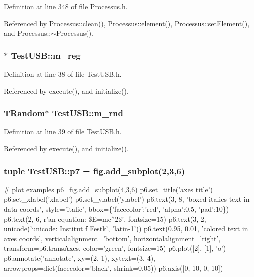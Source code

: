 Definition at line 348 of file Processus.h.

Referenced by Processus::clean(), Processus::element(), Processus::setElement(), and Processus::$\sim$Processus().\hypertarget{classTestUSB_a5f2bd3ef5db056bcfd803cb94d3a6587}{
\subsubsection[{m\_\-reg}]{$\ast$ {\bf TestUSB::m\_\-reg}}}
\label{classTestUSB_a5f2bd3ef5db056bcfd803cb94d3a6587}


Definition at line 38 of file TestUSB.h.

Referenced by execute(), and initialize().\hypertarget{classTestUSB_ac3ad0c22af51e67455f919474a658dbe}{
\subsubsection[{m\_\-rnd}]{\setlength{\rightskip}{0pt plus 5cm}TRandom$\ast$ {\bf TestUSB::m\_\-rnd}}}
\label{classTestUSB_ac3ad0c22af51e67455f919474a658dbe}


Definition at line 39 of file TestUSB.h.

Referenced by execute(), and initialize().\hypertarget{classTestUSB_a9901d0222a34f61c570c41fa6b7d5672}{
\subsubsection[{p7}]{\setlength{\rightskip}{0pt plus 5cm}tuple {\bf TestUSB::p7} = fig.add\_\-subplot(2,3,6)}}
\label{classTestUSB_a9901d0222a34f61c570c41fa6b7d5672}


\# plot examples p6=fig.add\_\-subplot(4,3,6) p6.set\_\-title('axes title') p6.set\_\-xlabel('xlabel') p6.set\_\-ylabel('ylabel') p6.text(3, 8, 'boxed italics text in data coords', style='italic', bbox=\{'facecolor':'red', 'alpha':0.5, 'pad':10\}) p6.text(2, 6, r'an equation: \$E=mc$^\wedge$2\$', fontsize=15) p6.text(3, 2, unicode('unicode: Institut f Festk', 'latin-\/1')) p6.text(0.95, 0.01, 'colored text in axes coords', verticalalignment='bottom', horizontalalignment='right', transform=p6.transAxes, color='green', fontsize=15) p6.plot(\mbox{[}2\mbox{]}, \mbox{[}1\mbox{]}, 'o') p6.annotate('annotate', xy=(2, 1), xytext=(3, 4), arrowprops=dict(facecolor='black', shrink=0.05)) p6.axis(\mbox{[}0, 10, 0, 10\mbox{]}) 

